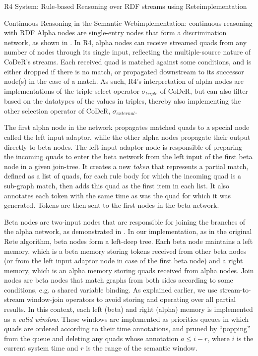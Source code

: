 \begin{nestedsection}{R4 System: Rule-based Reasoning over RDF streams using Rete}{implementation}
\begin{nestedsection}{Continuous Reasoning in the Semantic Web}{implementation: continuous reasoning with RDF}
		Alpha nodes are single-entry nodes that form a discrimination network, as shown in .
		In R4, alpha nodes can receive streamed quads from any number of nodes through its single input, reflecting the multiple-source nature of CoDeR's streams.
		Each received quad is matched against some conditions, and is either dropped if there is no match, or propagated downstream to its successor node(s) in the case of a match.
		As such, R4's interpretation of alpha nodes are implementations of the triple-select operator $\sigma_{triple}$ of CoDeR, but can also filter based on the datatypes of the values in triples, thereby also implementing the other selection operator of CoDeR, $\sigma_{external}$.

		The first alpha node in the network propagates matched quads to a special node called the left input adaptor, while the other alpha nodes propagate their output directly to beta nodes.
		The left input adaptor node is responsible of preparing the incoming quads to enter the beta network from the left input of the first beta node in a given join-tree.
		It creates a new \emph{token} that represents a partial match, defined as a list of quads, for each rule body for which the incoming quad is a sub-graph match, then adds this quad as the first item in each list.
		It also annotates each token with the same time as was the quad for which it was generated.
		Tokens are then sent to the first nodes in the beta network.

		Beta nodes are two-input nodes that are responsible for joining the branches of the alpha network, as demonstrated in .
		In our implementation, as in the original Rete algorithm, beta nodes form a left-deep tree.
		Each beta node maintains a left memory, which is a beta memory storing tokens received from other beta nodes (or from the left input adaptor node in case of the first beta node) and a right memory, which is an alpha memory storing quads received from alpha nodes.
		Join nodes are beta nodes that match graphs from both sides according to some conditions, e.g. a shared variable binding.
		As explained earlier, we use stream-to-stream window-join operators to avoid storing and operating over all partial results.
		In this context, each left (beta) and right (alpha) memory is implemented as a \emph{valid window}.
		These windows are implemented as priorities queues in which quads are ordered according to their time annotations, and pruned by ``popping'' from the queue and deleting any quads whose annotation $a \leqslant i - r$, where $i$ is the current system time and $r$ is the range of the semantic window.


\end{nestedsection}
\end{nestedsection}
